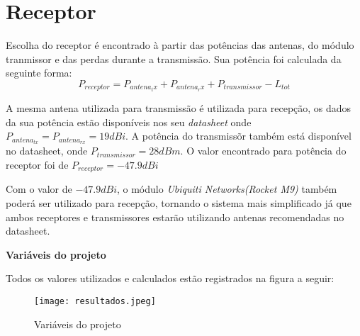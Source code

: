 \section{Receptor}
Escolha do receptor é encontrado à partir das potências das antenas, do módulo tranmissor e das perdas durante a transmissão. Sua potência foi calculada da seguinte forma:
\begin{equation}
	P_{receptor} = P_{antena_tx} + P_{antena_rx} + P_{transmissor} - L_{tot}
\end{equation}

A mesma antena utilizada para transmissão é utilizada para recepção, os dados da sua potência estão disponíveis nos seu \textit{datasheet} onde $P_{antena_{tx}} = P_{antena_{rx}} = 19dBi$. A potência do transmissõr também está disponível no datasheet, onde $P_{transmissor} = 28dBm$. O valor encontrado para potência do receptor foi de $	P_{receptor} = -47.9dBi$

Com o valor de $-47.9dBi$, o módulo \textit{Ubiquiti Networks(Rocket M9)} também poderá ser utilizado para recepção, tornando o sistema mais simplificado já que ambos receptores e transmissores estarão utilizando antenas recomendadas no datasheet.

\newpage
\begin{center}
	\Large \textbf{Variáveis do projeto}
\end{center}
Todos os valores utilizados e calculados estão registrados na figura a seguir:
\begin{figure}[h]
	\centering
	\texttt{[image: resultados.jpeg]}
	\label{fig:result}
	\caption{Variáveis do projeto}
\end{figure} 

